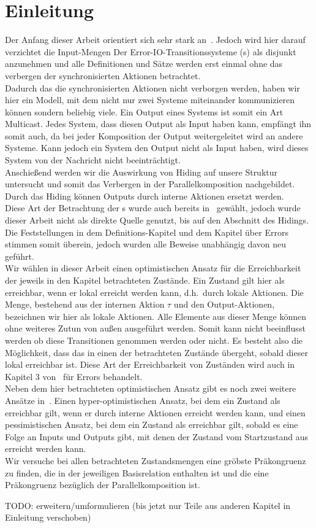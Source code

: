 \chapter{Einleitung}

Der Anfang dieser Arbeit orientiert sich sehr stark an~\cite{Vogler2014EIO}.
Jedoch wird hier darauf verzichtet die Input-Mengen Der
Error-IO-Transitionssysteme (\EIO{}s) als disjunkt anzunehmen und alle
Definitionen und Sätze werden erst einmal ohne das verbergen der
synchronisierten Aktionen betrachtet.\\
Dadurch das die synchronisierten Aktionen nicht verborgen werden, haben wir hier
ein Modell, mit dem nicht nur zwei Systeme miteinander kommunizieren können
sondern beliebig viele. Ein Output eines Systems ist somit ein Art Multicast.
Jedes System, dass diesen Output als Input haben kann, empfängt ihn somit auch,
da bei jeder Komposition der Output weitergeleitet wird an andere Systeme.
Kann jedoch ein System den Output nicht als Input haben, wird dieses System von
der Nachricht nicht beeinträchtigt.\\
Anschießend werden wir die Auswirkung von Hiding auf unsere Struktur
untersucht und somit das Verbergen in der Parallelkomposition nachgebildet.
Durch das Hiding können Outputs durch interne Aktionen ersetzt werden.\\
Diese Art der Betrachtung der
\EIO{}s wurde auch bereits in~\cite{Schlosser2012BA} gewählt, jedoch wurde
dieser Arbeit nicht als direkte Quelle genutzt, bis auf den Abschnitt des
Hidings. Die Feststellungen in dem Definitions-Kapitel und dem Kapitel über
Errors stimmen somit überein, jedoch wurden alle Beweise unabhängig davon neu
geführt.\\
Wir wählen in dieser Arbeit einen optimistischen Ansatz für die Erreichbarkeit
der jeweils in den Kapitel betrachteten Zustände. Ein Zustand gilt hier als erreichbar, wenn
er lokal erreicht werden kann, d.h.\ durch lokale Aktionen. Die Menge,
bestehend aus der internen Aktion $\tau$ und den Output-Aktionen, bezeichnen wir
hier als lokale Aktionen. Alle Elemente aus dieser Menge können ohne weiteres
Zutun von außen ausgeführt werden. Somit kann nicht beeinflusst werden ob diese
Transitionen genommen werden oder nicht. Es besteht also die Möglichkeit, dass das
\EIO{} in einen der betrachteten Zustände übergeht, sobald dieser lokal
erreichbar ist. Diese Art der Erreichbarkeit von Zuständen wird auch in Kapitel
3 von~\cite{Vogler2014EIO} für Errors behandelt.\\
Neben dem hier betrachteten optimistischen Ansatz gibt es noch zwei weitere
Ansätze in~\cite{Vogler2014EIO}. Einen hyper-optimistischen Ansatz, bei dem ein
Zustand als erreichbar gilt, wenn er durch interne Aktionen erreicht werden
kann, und einen pessimistischen Ansatz, bei dem ein Zustand als erreichbar gilt,
sobald es eine Folge an Inputs und Outputs gibt, mit denen der Zustand vom
Startzustand aus erreicht werden kann.\\
Wir versuche bei allen betrachteten Zustandsmengen eine gröbste Präkongruenz zu
finden, die in der jeweiligen Basisrelation enthalten ist und die eine
Präkongruenz bezüglich der Parallelkomposition ist.

\scriptsize\textcolor{lgray}{TODO: erweitern/umformulieren (bis jetzt nur Teile
aus anderen Kapitel in Einleitung verschoben)}

\normalsize
